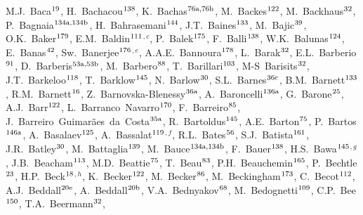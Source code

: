 \begin{flushleft}
M.J.~Baca$^\textrm{\scriptsize 19}$,
H.~Bachacou$^\textrm{\scriptsize 138}$,
K.~Bachas$^\textrm{\scriptsize 76a,76b}$,
M.~Backes$^\textrm{\scriptsize 122}$,
M.~Backhaus$^\textrm{\scriptsize 32}$,
P.~Bagnaia$^\textrm{\scriptsize 134a,134b}$,
H.~Bahrasemani$^\textrm{\scriptsize 144}$,
J.T.~Baines$^\textrm{\scriptsize 133}$,
M.~Bajic$^\textrm{\scriptsize 39}$,
O.K.~Baker$^\textrm{\scriptsize 179}$,
E.M.~Baldin$^\textrm{\scriptsize 111}$$^{,c}$,
P.~Balek$^\textrm{\scriptsize 175}$,
F.~Balli$^\textrm{\scriptsize 138}$,
W.K.~Balunas$^\textrm{\scriptsize 124}$,
E.~Banas$^\textrm{\scriptsize 42}$,
Sw.~Banerjee$^\textrm{\scriptsize 176}$$^{,e}$,
A.A.E.~Bannoura$^\textrm{\scriptsize 178}$,
L.~Barak$^\textrm{\scriptsize 32}$,
E.L.~Barberio$^\textrm{\scriptsize 91}$,
D.~Barberis$^\textrm{\scriptsize 53a,53b}$,
M.~Barbero$^\textrm{\scriptsize 88}$,
T.~Barillari$^\textrm{\scriptsize 103}$,
M-S~Barisits$^\textrm{\scriptsize 32}$,
J.T.~Barkeloo$^\textrm{\scriptsize 118}$,
T.~Barklow$^\textrm{\scriptsize 145}$,
N.~Barlow$^\textrm{\scriptsize 30}$,
S.L.~Barnes$^\textrm{\scriptsize 36c}$,
B.M.~Barnett$^\textrm{\scriptsize 133}$,
R.M.~Barnett$^\textrm{\scriptsize 16}$,
Z.~Barnovska-Blenessy$^\textrm{\scriptsize 36a}$,
A.~Baroncelli$^\textrm{\scriptsize 136a}$,
G.~Barone$^\textrm{\scriptsize 25}$,
A.J.~Barr$^\textrm{\scriptsize 122}$,
L.~Barranco~Navarro$^\textrm{\scriptsize 170}$,
F.~Barreiro$^\textrm{\scriptsize 85}$,
J.~Barreiro~Guimar\~{a}es~da~Costa$^\textrm{\scriptsize 35a}$,
R.~Bartoldus$^\textrm{\scriptsize 145}$,
A.E.~Barton$^\textrm{\scriptsize 75}$,
P.~Bartos$^\textrm{\scriptsize 146a}$,
A.~Basalaev$^\textrm{\scriptsize 125}$,
A.~Bassalat$^\textrm{\scriptsize 119}$$^{,f}$,
R.L.~Bates$^\textrm{\scriptsize 56}$,
S.J.~Batista$^\textrm{\scriptsize 161}$,
J.R.~Batley$^\textrm{\scriptsize 30}$,
M.~Battaglia$^\textrm{\scriptsize 139}$,
M.~Bauce$^\textrm{\scriptsize 134a,134b}$,
F.~Bauer$^\textrm{\scriptsize 138}$,
H.S.~Bawa$^\textrm{\scriptsize 145}$$^{,g}$,
J.B.~Beacham$^\textrm{\scriptsize 113}$,
M.D.~Beattie$^\textrm{\scriptsize 75}$,
T.~Beau$^\textrm{\scriptsize 83}$,
P.H.~Beauchemin$^\textrm{\scriptsize 165}$,
P.~Bechtle$^\textrm{\scriptsize 23}$,
H.P.~Beck$^\textrm{\scriptsize 18}$$^{,h}$,
K.~Becker$^\textrm{\scriptsize 122}$,
M.~Becker$^\textrm{\scriptsize 86}$,
M.~Beckingham$^\textrm{\scriptsize 173}$,
C.~Becot$^\textrm{\scriptsize 112}$,
A.J.~Beddall$^\textrm{\scriptsize 20e}$,
A.~Beddall$^\textrm{\scriptsize 20b}$,
V.A.~Bednyakov$^\textrm{\scriptsize 68}$,
M.~Bedognetti$^\textrm{\scriptsize 109}$,
C.P.~Bee$^\textrm{\scriptsize 150}$,
T.A.~Beermann$^\textrm{\scriptsize 32}$,
$$
\end{flushleft}
